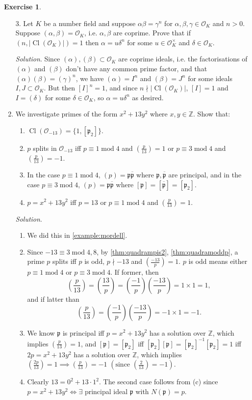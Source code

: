 \documentclass{article}
\newcommand{\Z}{\mathbb{Z}}
\newcommand{\Mod}{\operatorname{mod}}
\newcommand{\Cl}{\operatorname{Cl}}
\newcommand{\ri}{\mathcal{O}}
\newcommand{\ip}{\mathfrak{p}}
\theoremstyle{definition}
\newtheorem{exe}[defn]{Exercise}
\begin{document}
\begin{exe}
\begin{enumerate}
\item[3.] Let $K$ be a number field and suppose $\alpha\beta=\gamma^n$ for $\alpha,\beta,\gamma\in\ri_K$ and $n>0$. Suppose $(\alpha,\beta)=\ri_K$, i.e. $\alpha,\beta$ are coprime. Prove that if $\left(n,|\!\Cl(\ri_K)|\right)=1$ then $\alpha=u\delta^n$ for some $u\in\ri_K^\times$ and $\delta\in\ri_K$.

\textit{Solution}. Since $(\alpha),(\beta)\subset\ri_K$ are coprime ideals, i.e. the factorisations of $(\alpha)$ and $(\beta)$ don't have any common prime factor, and that $(\alpha)(\beta)=(\gamma)^n$, we have $(\alpha)=I^n$ and $(\beta)=J^n$ for some ideals $I,J\subset\ri_K$. But then $[I]^n=1$, and since $n\nmid |\!\Cl(\ri_K)|$, $[I]=1$ and $I=(\delta)$ for some $\delta\in\ri_K$, so $\alpha=u\delta^n$ as desired.

\item We investigate primes of the form $x^2+13y^2$ where $x,y\in\Z$. Show that:
\begin{enumerate}
\item $\Cl(\ri_{-13})=\{1,[\ip_2]\}$.
\item $p$ splits in $\ri_{-13}$ iff $p\equiv 1\Mod 4$ and $\left(\frac{p}{13}\right)=1$ or $p\equiv 3\Mod 4$ and $\left(\frac{p}{13}\right)=-1$.
\item In the case $p\equiv 1\Mod 4$, $(p)=\ip\overline{\ip}$ where $\ip,\overline{\ip}$ are principal, and in the case $p\equiv 3\Mod 4$, $(p)=\ip\overline{\ip}$ where $[\ip]=[\overline{\ip}]=[\ip_2]$.
\item $p=x^2+13y^2$ iff $p=13$ or $p\equiv 1\Mod 4$ and $\left(\frac{p}{13}\right)=1$.
\end{enumerate}

\textit{Solution}. \begin{enumerate}
\item We did this in \ref{example:mordell}.
\item Since $-13\equiv 3\Mod 4,8$, by \ref{thm:quadrampis2}, \ref{thm:quadramoddp}, a prime $p$ splits iff $p$ is odd, $p\nmid -13$ and $\left(\frac{-13}{p}\right)=1$. $p$ is odd means either $p\equiv 1\Mod 4$ or $p\equiv 3\Mod 4$. If former, then
\[
\left(\frac{p}{13}\right)=\left(\frac{13}{p}\right)=\left(\frac{-1}{p}\right)\left(\frac{-13}{p}\right)=1\times 1=1,
\]
and if latter than 
\[
\left(\frac{p}{13}\right)=\left(\frac{-1}{p}\right)\left(\frac{-13}{p}\right)=-1\times 1=-1.
\]
\item We know $\ip$ is principal iff $p=x^2+13y^2$ has a solution over $\Z$, which implies $\left(\frac{p}{13}\right)=1$, and $[\ip]=[\ip_2]$ iff $[\ip_2][\ip]=[\ip_2]^{-1}[\ip_2]=1$ iff $2p=x^2+13y^2$ has a solution over $\Z$, which implies $\left(\frac{2p}{13}\right)=1\implies \left(\frac{p}{13}\right)=-1$ $\left(\text{since }\left(\frac{2}{13}\right)=-1\right)$.
\item Clearly $13=0^2+13\cdot 1^2$. The second case follows from (c) since $p=x^2+13y^2\iff\exists$ principal ideal $\ip$ with $N(\ip)=p$.
\end{enumerate}


\end{enumerate}
\end{exe}
\end{document}
